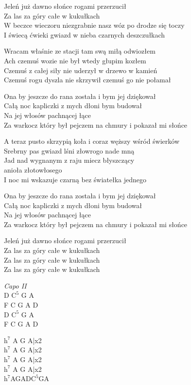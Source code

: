 \begin{text}
    \footnotesize{
    \hfill\break
Jeleń już dawno słońce rogami przerzucił\\
Za las za góry całe w kukułkach\\
W beczce wieczoru niezgrabnie nasz wóz po drodze się toczy\\
I świecą ćwieki gwiazd w nieba czarnych deszczułkach

Wracam właśnie ze stacji tam swą miłą odwiozłem\\
Ach czemuś wozie nie był wtedy głupim kozłem\\
Czemuś z całej siły nie uderzył w drzewo w kamień\\
Czemuś rogu dyszla nie skrzywił czemuś go nie połamał

Ona by jeszcze do rana została i bym jej dziękował\\
Całą noc kapliczki z mych dłoni bym budował\\
Na jej włosów pachnącej łące\\
Za warkocz który był pejczem na chmury i pokazał mi słońce

A teraz pusto skrzypią koła i coraz węższy wśród świerków\\
Srebrny pas gwiazd lśni złowrogo nade mną\\
Jad nad wygnanym z raju miecz błyszczący\\
    \vin\vin\vin\vin\vin anioła złotowłosego\\
I noc mi wskazuje czarną bez światełka jednego

Ona by jeszcze do rana została i bym jej dziękował\\
Całą noc kapliczki z mych dłoni bym budował\\
Na jej włosów pachnącej łące\\
Za warkocz który był pejczem na chmury i pokazał mi słońce

Jeleń już dawno słońce rogami przerzucił\\
Za las za góry całe w kukułkach\\
Za las za góry całe w kukułkach\\
Za las za góry całe w kukułkach
    }
\end{text}
\begin{chord}
    \footnotesize{
    \textit{Capo II}\\
    D $\mathrm{C^5}$ G A\\
    F C G A D\\
    D $\mathrm{C^5}$ G A\\
    F C G A D

    $\mathrm{h^7}$ A G A|x2\\
    $\mathrm{h^7}$ A G A|x2\\
    $\mathrm{h^7}$ A G A|x2\\
    $\mathrm{h^7}$ A G A|x2\\
    $\mathrm{h^7}$AGAD$\mathrm{C^5}$GA\\
    }
\end{chord}
